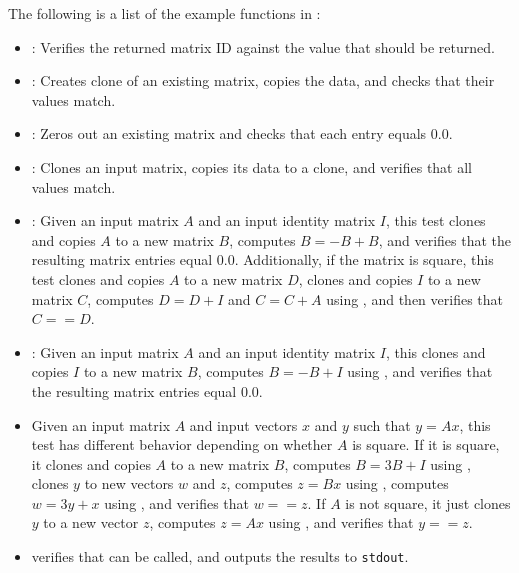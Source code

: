 \noindent The following is a list of the example functions in :
\begin{itemize}
\item {}: Verifies the returned matrix ID against
      the value that should be returned.
\item {}: Creates clone of an existing matrix,
      copies the data, and checks that their values match.  
\item {}: Zeros out an existing matrix and checks
      that each entry equals 0.0.
\item {}: Clones an input matrix, copies its data
      to a clone, and verifies that all values match.
\item {}: Given an input matrix $A$ and an
      input identity matrix $I$, this test clones and copies $A$ to a new
      matrix $B$, computes $B = -B+B$, and verifies that the resulting
      matrix entries equal 0.0.  Additionally, if the matrix is
      square, this test clones and copies $A$ to a new matrix $D$, clones and
      copies $I$ to a new matrix $C$, computes $D = D+I$ and
      $C = C+A$ using , and then verifies that
      $C==D$.
\item {}: Given an input matrix $A$ and an
      input identity matrix $I$, this clones and copies $I$ to a new
      matrix $B$, computes $B = -B+I$ using , and
      verifies that the resulting matrix entries equal 0.0.
\item {} Given an input matrix $A$ and input
      vectors $x$ and $y$ such that $y=Ax$, this test has different
      behavior depending on whether $A$ is square.  If it is square,
      it clones and copies $A$ to a new matrix $B$, computes
      $B = 3B+I$ using , clones $y$ to new vectors
      $w$ and $z$, computes $z = Bx$ using , computes
      $w = 3y+x$ using , and verifies that $w==z$.
      If $A$ is not square, it just clones $y$ to a new vector $z$,
      computes $z=Ax$ using , and verifies that
      $y==z$.
\item {} verifies that  can be
      called, and outputs the results to \texttt{stdout}.
\end{itemize}
